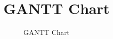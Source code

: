 \section{GANTT Chart}
\label{sec:GANTT Chart}
\label{fig:GANTT Chart}
\begin{figure}[H]
	\centering
	\caption{GANTT Chart}
\end{figure}
\newpage




